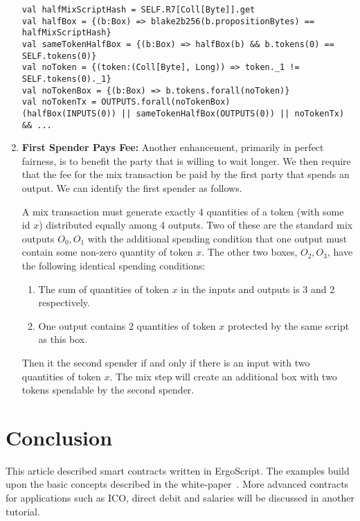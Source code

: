 \documentclass[11pt]{article}
\newcommand{\langname}{ErgoScript\xspace}
\begin{document}
\begin{enumerate}
\begin{verbatim}
val halfMixScriptHash = SELF.R7[Coll[Byte]].get
val halfBox = {(b:Box) => blake2b256(b.propositionBytes) == halfMixScriptHash}
val sameTokenHalfBox = {(b:Box) => halfBox(b) && b.tokens(0) == SELF.tokens(0)}
val noToken = {(token:(Coll[Byte], Long)) => token._1 != SELF.tokens(0)._1}
val noTokenBox = {(b:Box) => b.tokens.forall(noToken)}
val noTokenTx = OUTPUTS.forall(noTokenBox)
(halfBox(INPUTS(0)) || sameTokenHalfBox(OUTPUTS(0)) || noTokenTx) && ...
\end{verbatim}
\item \textbf{First Spender Pays Fee:} Another enhancement, primarily in perfect fairness, is to benefit the party that is willing to wait longer. We then require that the fee for the mix transaction be paid by the first party that spends an output. We can identify the first spender as follows. 

A mix transaction must generate exactly 4 quantities of a token (with some id $x$) distributed equally among 4 outputs. Two of these are the standard mix outputs $O_0, O_1$ with the additional spending condition that one output must contain some non-zero quantity of token $x$. The other two boxes, $O_2, O_3$, have the following identical spending conditions:
\begin{enumerate}
	\item The sum of quantities of token $x$ in the inputs and outputs is 3 and 2 respectively.
	\item One output contains 2 quantities of token $x$ protected by the same script as this box. 
\end{enumerate}

Then it the second spender if and only if there is an input with two quantities of token $x$. 
The mix step will create an additional box with two tokens spendable by the second spender.
\end{enumerate}


\section{Conclusion}

This article described smart contracts written in \langname. The examples build upon the basic concepts described in the white-paper~\cite{whitepaper}. More advanced contracts for applications such as ICO, direct debit and salaries will be discussed in another tutorial.



\end{document}
